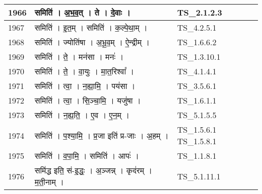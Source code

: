 \documentclass[17pt]{extarticle}
\begin{document}
\begin{longtable}{||p{0.4in}||p{4.9in}||p{0.9in}||}
    1966 & समिति॑   ।   अ॒भ॒व॒त्   ।   ते   ।   दे॒वाः   ।    & TS\_2.1.2.3       \\
    
    \hline
        
    1967 & समिति॑   ।   इ॒त॒म्   ।   समिति॑   ।   क॒ल्पे॒था॒म्   ।    & TS\_4.2.5.1       \\
    
    \hline
        
    1968 & समिति॑   ।   ज्योति॑षा   ।   अ॒भू॒व॒म्   ।   ऐ॒न्द्रीम्   ।    & TS\_1.6.6.2       \\
    
    \hline
        
    1969 & समिति॑   ।   ते॒   ।   मन॑सा   ।   मनः॑   ।    & TS\_1.3.10.1       \\
    
    \hline
        
    1970 & समिति॑   ।   ते॒   ।   वा॒युः   ।   मा॒त॒रिश्वा᳚   ।    & TS\_4.1.4.1       \\
    
    \hline
        
    1971 & समिति॑   ।   त्वा॒   ।   न॒ह्या॒मि॒   ।   पय॑सा   ।    & TS\_3.5.6.1       \\
    
    \hline
        
    1972 & समिति॑   ।   त्वा॒   ।   सि॒ञ्चा॒मि॒   ।   यजु॑षा   ।    & TS\_1.6.1.1       \\
    
    \hline
        
    1973 & समिति॑   ।   न॒ह्य॒ति॒   ।   ए॒व   ।   ए॒न॒म्   ।    & TS\_5.1.5.5       \\
    
    \hline
        
    1974 & समिति॑   ।   प॒श्या॒मि॒   ।   प्र॒जा इति॑ प्र{-}जाः   ।   अ॒हम्   ।    & TS\_1.5.6.1 TS\_1.5.8.1       \\
    
    \hline
        
    1975 & समिति॑   ।   व॒पा॒मि॒   ।   समिति॑   ।   आपः॑   ।    & TS\_1.1.8.1       \\
    
    \hline
        
    1976 & समि॑द्ध इति॒ सं{-}इ॒द्धः॒   ।   अ॒ञ्जन्न्   ।   कृद॑रम्   ।   म॒ती॒नाम्   ।    & TS\_5.1.11.1       \\
    
    \hline
        

\end{longtable}
\end{document}
